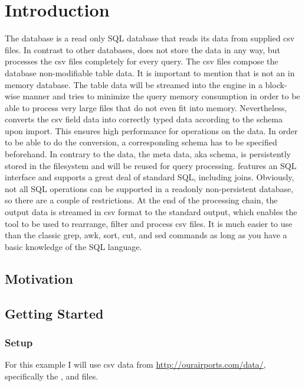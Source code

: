 
\chapter{Introduction}
The \csvsqldb{} database is a read only SQL database that reads its data from supplied csv files. In contrast to other databases, \csvsqldb{} does not store the data in any way, but processes the csv files completely for every query. The csv files compose the database non-modifiable table data. It is important to mention that \csvsqldb{} is not an in memory database. The table data will be streamed into the engine in a block-wise manner and \csvsqldb{} tries to minimize the query memory consumption in order to be able to process very large files that do not even fit into memory. Nevertheless, \csvsqldb{} converts the csv field data into correctly typed data according to the schema upon import. This ensures high performance for operations on the data. In order to be able to do the conversion, a corresponding schema has to be specified beforehand. In contrary to the data, the meta data, aka schema, is persistently stored in the filesystem and will be reused for query processing. \csvsqldb{} features an SQL interface and supports a great deal of standard SQL, including joins. Obviously, not all SQL operations can be supported in a readonly non-persistent database, so there are a couple of restrictions. At the end of the processing chain, the output data is streamed in csv format to the standard output, which enables the tool to be used to rearrange, filter and process csv files. It is much easier to use than the classic grep, awk, sort, cut, and sed commands as long as you have a basic knowledge of the SQL language.

\section{Motivation}

\section{Getting Started}

\subsection{Setup}
For this example I will use csv data from {\small \url{http://ourairports.com/data/}}, specifically the ,  and  files.

